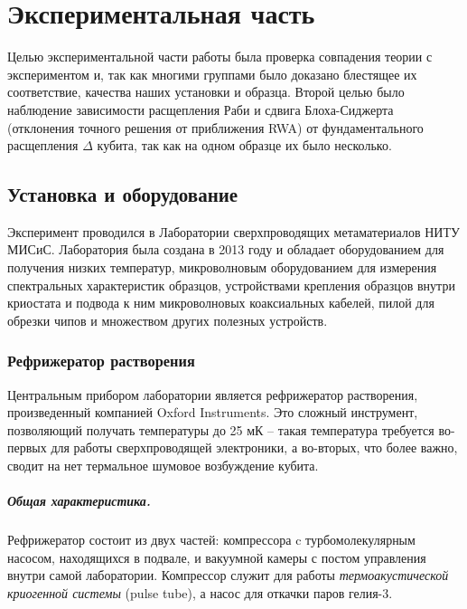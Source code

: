\documentclass[12pt, twoside]{report}
\numberwithin{equation}{section}
\numberwithin{figure}{section}
\begin{document}
\fi
\chapter{Экспериментальная часть} \label{chap:exp}

Целью экспериментальной части работы была проверка совпадения теории с экспериментом и, так как многими группами было доказано блестящее их соответствие\cite{bishop2009, niemczyk2010, forn2010}, качества наших установки и образца. Второй целью было наблюдение зависимости расщепления Раби и сдвига Блоха-Сиджерта\cite{forn2010} (отклонения точного решения от приближения RWA) от фундаментального расщепления $\Delta$ кубита, так как на одном образце их было несколько. 

\section{Установка и оборудование}

Эксперимент проводился в Лаборатории сверхпроводящих метаматериалов НИТУ МИСиС. Лаборатория была создана в 2013 году и обладает оборудованием для получения низких температур, микроволновым оборудованием для измерения спектральных характеристик образцов, устройствами крепления образцов внутри криостата и подвода к ним микроволновых коаксиальных кабелей, пилой для обрезки чипов и множеством других полезных устройств. 

\subsection{Рефрижератор растворения}

Центральным прибором лаборатории является рефрижератор растворения, произведенный компанией Oxford Instruments. Это сложный инструмент, позволяющий получать температуры до 25 мК -- такая температура требуется во-первых для работы сверхпроводящей электроники, а во-вторых, что более важно, сводит на нет термальное шумовое возбуждение кубита. 

\paragraph{Общая характеристика.} Рефрижератор состоит из двух частей: компрессора c турбомолекулярным насосом, находящихся в подвале, и вакуумной камеры с постом управления внутри самой лаборатории. Компрессор служит для работы \textit{термоакустической криогенной системы} (pulse tube), а насос для откачки паров гелия-3.
\end{document}
